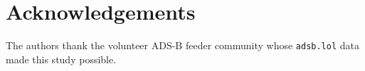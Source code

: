 \documentclass[3p,times,sort&compress,authoryear,review]{elsarticle}
\begin{document}
\section*{Acknowledgements}
\label{sec:ack}
The authors thank the volunteer ADS-B feeder community whose
\texttt{adsb.lol} data made this study possible.




\appendix

\end{document}
